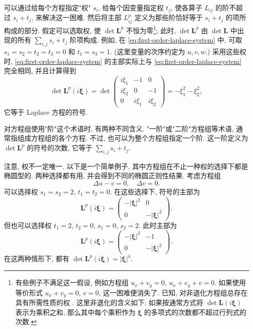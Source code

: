 可以通过给每个方程指定"权" $s_i$, 给每个因变量指定权 $t_j$, 使各算子 $L_{ij}$ 的阶不超过 $s_i+t_j$, 来解决这一困难. 然后将主部 $L_{ij}^p$ 定义为那些阶恰好等于 $s_i+t_j$ 的项所构成的部分. 假定可以选取权, 使 $\det\bm{L}^p$ 不恒为零\footnote{有些例子不满足这一假设, 例如方程组 $u_x+v_y=0$, $u_x+v_y+v=0$. 如果使用等价形式 $u_x+v_y=0$, $v=0$, 这一困难便消失了. 已知, 对非退化方程组总存在具有所需性质的权 \cite{Vo}. 这里非退化的含义如下: 如果按通常方式将 $\det\bm{L}(i\bm{\xi})$ 表示为乘积之和, 那么其中每个乘积作为 $\bm{\xi}$ 的多项式的次数都不超过行列式的次数.}; 此时, $\det\bm{L}^p$ 由 $\det\bm{L}$ 中出现的所有 $\sum_{i,j}s_i+t_j$ 阶项构成. 例如, 在 \eqref{eq:first-order-laplace-system} 中, 可取 $s_1=s_2=t_2=t_3=0$ 和 $t_1=s_3=1$. (这里变量的次序约定为 $u,v,w$.) 采用这些权时, \eqref{eq:first-order-laplace-system} 的主部实际上与 \eqref{eq:first-order-laplace-system} 完全相同, 并且计算得到
\begin{equation}\label{eq:weighted-laplace-principal-determinant}
\det\bm{L}^p(i\bm{\xi})=\det\begin{pmatrix}i\xi_1&-1&0\\i\xi_2&0&-1\\0&i\xi_1&i\xi_2\end{pmatrix}=-\xi_1^2-\xi_2^2,
\end{equation}
它等于 Laplace 方程的符号.

对方程组使用"阶"这个术语时, 有两种不同含义. "一阶"或"二阶"方程组等术语, 通常指组成方程组的各个方程. 不过, 也可以为整个方程组指定一个阶. 这一阶定义为 $\det\bm{L}^p$ 的符号的次数, 它等于 $\sum_{i,j}s_i+t_j$.

\begin{Remark}
\label{rem:nonunique-principal-weights}
注意, 权不一定唯一. 以下是一个简单例子, 其中方程组在不止一种权的选择下都是椭圆型的. 两种选择都有用, 并会得到不同的椭圆正则性结果. 考虑方程组
\begin{equation}\label{eq:two-weight-elliptic-system}
\Delta u-v=0,\quad\Delta v=0.
\end{equation}
可以选择权 $s_1=s_2=2$, $t_1=t_2=0$. 在这些选择下, 符号的主部为
\begin{equation}\label{eq:first-choice-weighted-principal-symbol}
\bm{L}^p(i\bm{\xi})=\begin{pmatrix}-|\bm{\xi}|^2&0\\0&-|\bm{\xi}|^2\end{pmatrix}.
\end{equation}
但也可以选择权 $t_1=2$, $t_2=0$, $s_1=0$, $s_2=2$. 此时主部为
\begin{equation}\label{eq:second-choice-weighted-principal-symbol}
\bm{L}^p(i\bm{\xi})=\begin{pmatrix}-|\bm{\xi}|^2&-1\\0&-|\bm{\xi}|^2\end{pmatrix}.
\end{equation}
在这两种情形下, 都有 $\det\bm{L}^p(i\bm{\xi})=|\bm{\xi}|^4$.
\end{Remark}

